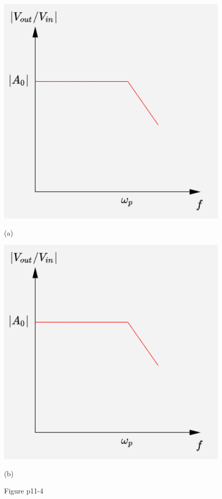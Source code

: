 \documentclass[hyperref, UTF8]{ctexart}
\begin{document}
    \begin{figure}[!htb]
        \centering
        \begin{minipage}[t]{0.259\textwidth}
        \centering
        \includegraphics[width=1\textwidth]{p11-4-c-sol.png}
        \caption*{(a)}
        \end{minipage}
        \begin{minipage}[t]{0.259\textwidth}
        \centering
        \includegraphics[width=1\textwidth]{p11-4-d-sol.png}
        \caption*{(b)}
        \end{minipage}
        \caption*{Figure p11-4}
    \end{figure}    
\end{document}
